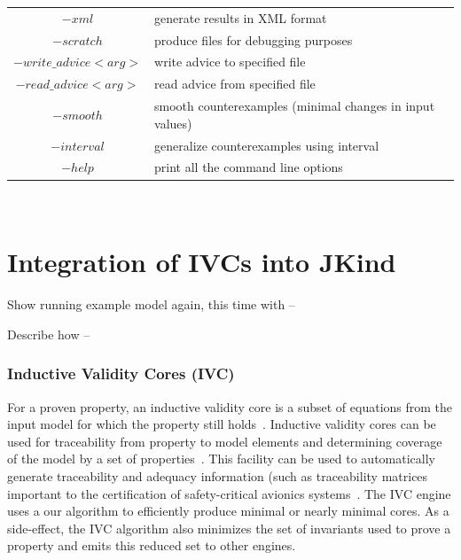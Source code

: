 \begin{table}
\begin{tabularx}{\linewidth}{|c|L|}
  $-xml$ & generate results in XML format\\[0.5ex]
  $-scratch$ & produce files for debugging purposes\\[0.5ex]\hline
    $-write\_advice <arg>$ & write advice to specified file\\[0.5ex]
  $ -read\_advice <arg>$ & read advice from specified file \\[0.5ex]\hline
    $-smooth$ & smooth counterexamples (minimal changes in  input values)\\[0.5ex]
    $-interval$ & generalize counterexamples using interval\\[0.5ex]\hline
  $-help$ & print all the command line options \\[0.5ex]
  \hline
\end{tabularx}\\
\label{tab:jkindcm}
\end{table}

\section{Integration of IVCs into {\sc JKind}}
Show running example model again, this time with --%

Describe how --%

\subsubsection{Inductive Validity Cores (IVC)}

For a proven property, an inductive validity core is a subset of \lustre equations from the input model for which the property still
holds~\cite{ghassabani2016fse}.  Inductive validity cores can be used for traceability from property to model elements and determining coverage of the model by a set of properties~\cite{Ghass17Cov}.  This facility can be used to automatically generate traceability and adequacy information (such as traceability matrices~\cite{fifarek2017nfm} important to the certification of safety-critical avionics systems~\cite{DO178C}.
The IVC engine uses a our \ucalg algorithm to efficiently produce minimal or nearly minimal cores. As a side-effect, the IVC algorithm also minimizes the set of invariants used to prove a property and emits this reduced set to other engines.


